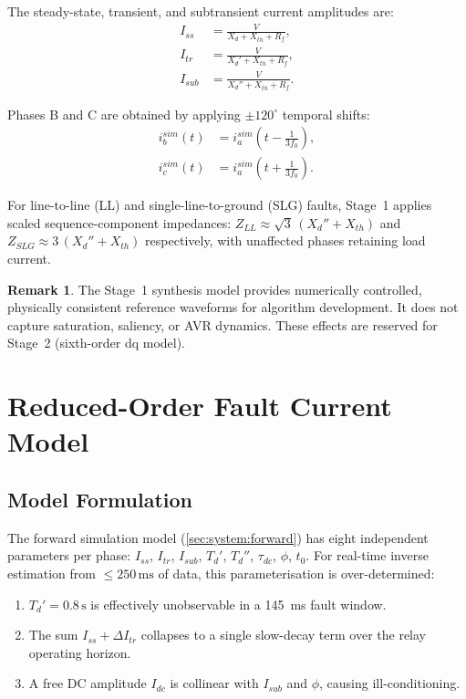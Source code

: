 \documentclass[12pt, a4paper]{article}
\theoremstyle{definition}
\newtheorem{remark}{Remark}[section]
\theoremstyle{plain}
\begin{document}
The steady-state, transient, and subtransient current amplitudes are:
\begin{align}
  I_{ss}  &= \frac{V}{X_d + X_{th} + R_f},  \label{eq:Iss} \\
  I_{tr}  &= \frac{V}{X_d' + X_{th} + R_f}, \label{eq:Itr} \\
  I_{sub} &= \frac{V}{X_d'' + X_{th} + R_f}. \label{eq:Isub}
\end{align}

Phases B and C are obtained by applying $\pm 120^\circ$ temporal shifts:
\begin{align}
  i_b^{sim}(t) &= i_a^{sim}\!\left(t - \frac{1}{3f_0}\right), \\
  i_c^{sim}(t) &= i_a^{sim}\!\left(t + \frac{1}{3f_0}\right).
\end{align}

For line-to-line (LL) and single-line-to-ground (SLG) faults, Stage~1 applies
scaled sequence-component impedances:
$Z_{LL} \approx \sqrt{3}\,(X_d'' + X_{th})$ and
$Z_{SLG} \approx 3\,(X_d'' + X_{th})$ respectively, with unaffected phases
retaining load current.

\begin{remark}
The Stage~1 synthesis model provides numerically controlled, physically
consistent reference waveforms for algorithm development.  It does not
capture saturation, saliency, or AVR dynamics.  These effects are reserved
for Stage~2 (sixth-order dq model).
\end{remark}

\section{Reduced-Order Fault Current Model}
\label{sec:model}

\subsection{Model Formulation}
\label{sec:model:formulation}

The forward simulation model (\cref{sec:system:forward}) has eight independent
parameters per phase: $I_{ss}$, $I_{tr}$, $I_{sub}$, $T_d'$, $T_d''$,
$\tau_{dc}$, $\phi$, $t_0$.  For real-time inverse estimation from
$\leq 250\,\text{ms}$ of data, this parameterisation is over-determined:
\begin{enumerate}
  \item $T_d' = 0.8\,\text{s}$ is effectively unobservable in a 145~ms fault window.
  \item The sum $I_{ss} + \Delta I_{tr}$ collapses to a single slow-decay term
        over the relay operating horizon.
  \item A free DC amplitude $I_{dc}$ is collinear with $I_{sub}$ and $\phi$,
        causing ill-conditioning.
\end{enumerate}
\end{document}
